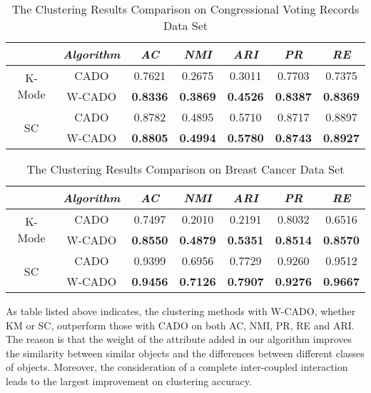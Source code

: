 \documentclass[review]{elsarticle}
\begin{document}
\begin{table}[!h]\tabcolsep=0.065in
\centering
\caption{The Clustering Results Comparison on Congressional Voting Records Data Set}
\small
\label{tab:The Clustering Results Comparison on Congressional Voting Records Data Set}
\begin{tabular}{c|c|c|c|c|c|c}
\hline
\emph{}&\emph{Algorithm}&\emph{AC}&\emph{NMI}&\emph{ARI}&\emph{PR}&\emph{RE} \\
\hline
\multirow{2}{*}{K-Mode} & CADO & 0.7621 & 0.2675 & 0.3011 & 0.7703 & 0.7375\\
    & W-CADO & \textbf{0.8336} & \textbf{0.3869} & \textbf{0.4526} & \textbf{0.8387} & \textbf{0.8369}\\
    \hline
\multirow{2}{*}{SC} & CADO & 0.8782 & 0.4895 & 0.5710 & 0.8717 & 0.8897\\
    & W-CADO & \textbf{0.8805} & \textbf{0.4994} & \textbf{0.5780} & \textbf{0.8743} & \textbf{0.8927}\\
\hline
\end{tabular}
\end{table}

\begin{table}[!h]\tabcolsep=0.065in
\centering
\caption{The Clustering Results Comparison on Breast Cancer Data Set}
\small
\label{tab:The Clustering Results Comparison on Breast Cancer Data Set}
\begin{tabular}{c|c|c|c|c|c|c}
\hline
\emph{}&\emph{Algorithm}&\emph{AC}&\emph{NMI}&\emph{ARI}&\emph{PR}&\emph{RE} \\
\hline
\multirow{2}{*}{K-Mode} & CADO & 0.7497 & 0.2010 & 0.2191 & 0.8032 & 0.6516\\
    & W-CADO & \textbf{0.8550} & \textbf{0.4879} & \textbf{0.5351} & \textbf{0.8514} & \textbf{0.8570}\\
    \hline
\multirow{2}{*}{SC} & CADO & 0.9399 & 0.6956 & 0.7729 & 0.9260 & 0.9512\\
    & W-CADO & \textbf{0.9456} & \textbf{0.7126} & \textbf{0.7907} & \textbf{0.9276} & \textbf{0.9667}\\
\hline
\end{tabular}
\end{table}


 As table listed above indicates, the clustering methods with W-CADO, whether KM or SC, outperform those with CADO on both AC, NMI, PR, RE and ARI. The reason is that the weight of the attribute added in our algorithm improves the similarity between similar objects and the differences between different classes of objects. Moreover, the consideration of a complete inter-coupled interaction leads to the largest improvement on clustering accuracy.
\end{document}
